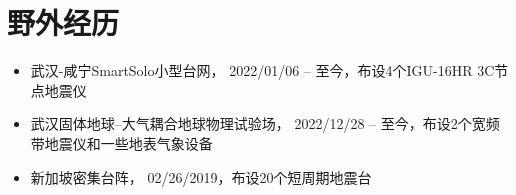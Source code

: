 \section{野外经历}

\begin{itemize}
\item 武汉-咸宁SmartSolo小型台网，
      2022/01/06 -- 至今，布设4个IGU-16HR 3C节点地震仪
\item 武汉固体地球--大气耦合地球物理试验场，
      2022/12/28 -- 至今，布设2个宽频带地震仪和一些地表气象设备
\item 新加坡密集台阵，
      02/26/2019，布设20个短周期地震台
\end{itemize}
